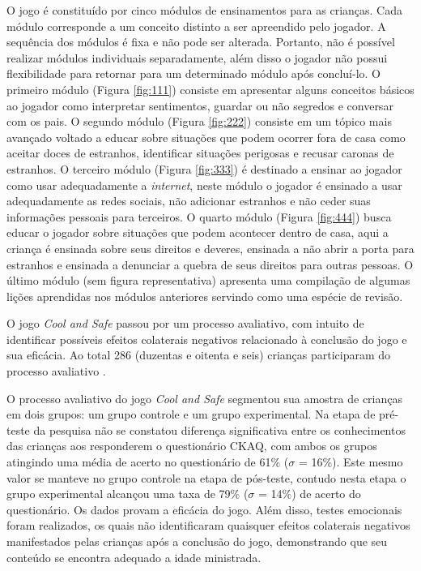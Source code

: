 O jogo é constituído por cinco módulos de ensinamentos para as crianças. Cada módulo corresponde a um conceito distinto a ser apreendido pelo jogador. A sequência dos módulos é fixa e não pode ser alterada. Portanto, não é possível realizar módulos individuais separadamente, além disso o jogador não possui flexibilidade para retornar para um determinado módulo após concluí-lo. O primeiro módulo (Figura \ref{fig:111}) consiste em apresentar alguns conceitos básicos ao jogador como interpretar sentimentos, guardar ou não segredos e conversar com os pais. O segundo módulo (Figura \ref{fig:222}) consiste em um tópico mais avançado voltado a educar sobre situações que podem ocorrer fora de casa como aceitar doces de estranhos, identificar situações perigosas e recusar caronas de estranhos. O terceiro módulo (Figura \ref{fig:333}) é destinado a ensinar ao jogador como usar adequadamente a \textit{internet}, neste módulo o jogador é ensinado a usar adequadamente as redes sociais, não adicionar estranhos e não ceder suas informações pessoais para terceiros. O quarto módulo (Figura \ref{fig:444}) busca educar o jogador sobre situações que podem acontecer dentro de casa, aqui a criança é ensinada sobre seus direitos e deveres, ensinada a não abrir a porta para estranhos e ensinada a denunciar a quebra de seus direitos para outras pessoas. O último módulo (sem figura representativa) apresenta uma compilação de algumas lições aprendidas nos módulos anteriores servindo como uma espécie de revisão. 

O jogo \textit{Cool and Safe} passou por um processo avaliativo, com intuito de identificar possíveis efeitos colaterais negativos relacionado à conclusão do jogo e sua eficácia. Ao total 286 (duzentas e oitenta e seis) crianças participaram do processo avaliativo \cite{muller2014child}. 

O processo avaliativo do jogo \textit{Cool and Safe} segmentou sua amostra de crianças em dois grupos: um grupo controle e um grupo experimental. Na etapa de pré-teste da pesquisa não se constatou diferença significativa entre os conhecimentos das crianças aos responderem o questionário \ac{CKAQ}, com ambos os grupos atingindo uma média de acerto no questionário de 61\% ($\sigma$ = 16\%). Este mesmo valor se manteve no grupo controle na etapa de pós-teste, contudo nesta etapa o grupo experimental alcançou uma taxa de 79\%  ($\sigma$ = 14\%) de acerto do questionário. Os dados provam a eficácia do jogo. Além disso, testes emocionais foram realizados, os quais não identificaram quaisquer efeitos colaterais negativos manifestados pelas crianças após a conclusão do jogo, demonstrando que seu conteúdo se encontra adequado a idade ministrada. 


